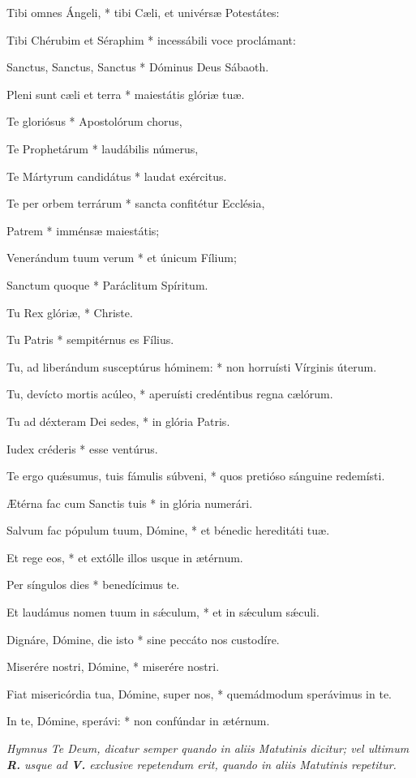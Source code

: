 \documentclass[12pt,a6paper]{book}
\newcommand{\V}{\textbf{V.} }
\newcommand{\R}{\textbf{R.} }
\begin{document}
\begin{sloppy}
Tibi omnes Ángeli, * tibi Cæli, et univérsæ Potestátes:

Tibi Chérubim et Séraphim * incessábili voce proclámant:

Sanctus, Sanctus, Sanctus * Dóminus Deus Sábaoth.

Pleni sunt cæli et terra * maiestátis glóriæ tuæ.

Te gloriósus * Apostolórum chorus,

Te Prophetárum * laudábilis númerus,

Te Mártyrum candidátus * laudat exércitus.

Te per orbem terrárum * sancta confitétur Ecclésia,

Patrem * imménsæ maiestátis;

Venerándum tuum verum * et únicum Fílium;

Sanctum quoque * Paráclitum Spíritum.

Tu Rex glóriæ, * Christe.

Tu Patris * sempitérnus es Fílius.

Tu, ad liberándum susceptúrus hóminem: * non horruísti Vírginis úterum.

Tu, devícto mortis acúleo, * aperuísti credéntibus regna cælórum.

Tu ad déxteram Dei sedes, * in glória Patris.

Iudex créderis * esse ventúrus.

Te ergo quǽsumus, tuis fámulis súbveni, * quos pretióso sánguine redemísti.

Ætérna fac cum Sanctis tuis * in glória numerári.

Salvum fac pópulum tuum, Dómine, * et bénedic hereditáti tuæ.

Et rege eos, * et extólle illos usque in ætérnum.

Per síngulos dies * benedícimus te.

Et laudámus nomen tuum in sǽculum, * et in sǽculum sǽculi.

Dignáre, Dómine, die isto * sine peccáto nos custodíre.

Miserére nostri, Dómine, * miserére nostri.

Fiat misericórdia tua, Dómine, super nos, * quemádmodum sperávimus in te.

In te, Dómine, sperávi: * non confúndar in ætérnum.

\textit{Hymnus Te Deum, dicatur semper quando in aliis Matutinis dicitur; vel ultimum \R usque ad \V exclusive repetendum erit, quando in aliis Matutinis repetitur.}


\end{sloppy}
\end{document}
